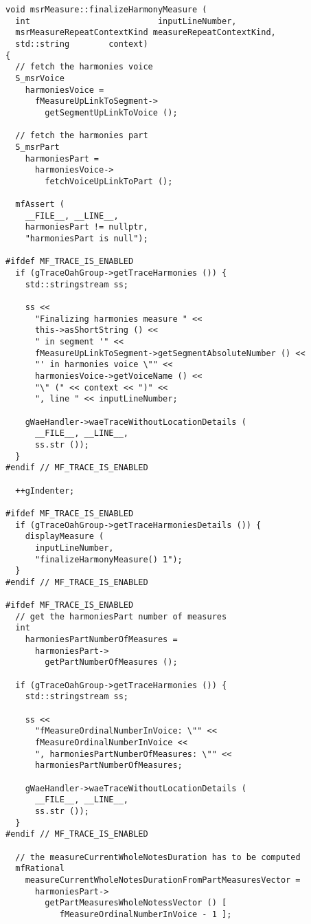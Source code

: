 \begin{lstlisting}[language=CPlusPlus]
void msrMeasure::finalizeHarmonyMeasure (
  int                          inputLineNumber,
  msrMeasureRepeatContextKind measureRepeatContextKind,
  std::string        context)
{
  // fetch the harmonies voice
  S_msrVoice
    harmoniesVoice =
      fMeasureUpLinkToSegment->
        getSegmentUpLinkToVoice ();

  // fetch the harmonies part
  S_msrPart
    harmoniesPart =
      harmoniesVoice->
        fetchVoiceUpLinkToPart ();

  mfAssert (
    __FILE__, __LINE__,
    harmoniesPart != nullptr,
    "harmoniesPart is null");

#ifdef MF_TRACE_IS_ENABLED
  if (gTraceOahGroup->getTraceHarmonies ()) {
    std::stringstream ss;

    ss <<
      "Finalizing harmonies measure " <<
      this->asShortString () <<
      " in segment '" <<
      fMeasureUpLinkToSegment->getSegmentAbsoluteNumber () <<
      "' in harmonies voice \"" <<
      harmoniesVoice->getVoiceName () <<
      "\" (" << context << ")" <<
      ", line " << inputLineNumber;

    gWaeHandler->waeTraceWithoutLocationDetails (
      __FILE__, __LINE__,
      ss.str ());
  }
#endif // MF_TRACE_IS_ENABLED

  ++gIndenter;

#ifdef MF_TRACE_IS_ENABLED
  if (gTraceOahGroup->getTraceHarmoniesDetails ()) {
    displayMeasure (
      inputLineNumber,
      "finalizeHarmonyMeasure() 1");
  }
#endif // MF_TRACE_IS_ENABLED

#ifdef MF_TRACE_IS_ENABLED
  // get the harmoniesPart number of measures
  int
    harmoniesPartNumberOfMeasures =
      harmoniesPart->
        getPartNumberOfMeasures ();

  if (gTraceOahGroup->getTraceHarmonies ()) {
    std::stringstream ss;

    ss <<
      "fMeasureOrdinalNumberInVoice: \"" <<
      fMeasureOrdinalNumberInVoice <<
      ", harmoniesPartNumberOfMeasures: \"" <<
      harmoniesPartNumberOfMeasures;

    gWaeHandler->waeTraceWithoutLocationDetails (
      __FILE__, __LINE__,
      ss.str ());
  }
#endif // MF_TRACE_IS_ENABLED

  // the measureCurrentWholeNotesDuration has to be computed
  mfRational
    measureCurrentWholeNotesDurationFromPartMeasuresVector =
      harmoniesPart->
        getPartMeasuresWholeNotessVector () [
           fMeasureOrdinalNumberInVoice - 1 ];


\end{lstlisting}
